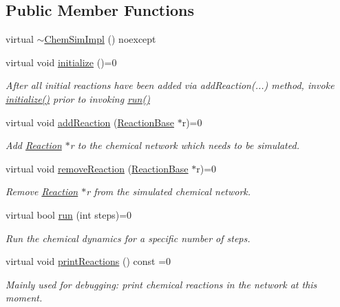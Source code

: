\subsection*{Public Member Functions}
\begin{DoxyCompactItemize}
\item 
virtual \hyperlink{classChemSimImpl_a80f4448613360c953bb57e25b4366737}{$\sim$\+Chem\+Sim\+Impl} () noexcept
\item 
virtual void \hyperlink{classChemSimImpl_a8050874ed2646d6632ec9df1704c86c4}{initialize} ()=0
\begin{DoxyCompactList}\small\item\em After all initial reactions have been added via add\+Reaction(...) method, invoke \hyperlink{classChemSimImpl_a8050874ed2646d6632ec9df1704c86c4}{initialize()} prior to invoking \hyperlink{classChemSimImpl_a3472132dc4b356ed76116c40af2a773d}{run()} \end{DoxyCompactList}\item 
virtual void \hyperlink{classChemSimImpl_ae1ca0468b4564703d87d69f45ee6e1f9}{add\+Reaction} (\hyperlink{classReactionBase}{Reaction\+Base} $\ast$r)=0
\begin{DoxyCompactList}\small\item\em Add \hyperlink{classReaction}{Reaction} $\ast$r to the chemical network which needs to be simulated. \end{DoxyCompactList}\item 
virtual void \hyperlink{classChemSimImpl_a2561de21097a1b12bc60bc53a966e9fc}{remove\+Reaction} (\hyperlink{classReactionBase}{Reaction\+Base} $\ast$r)=0
\begin{DoxyCompactList}\small\item\em Remove \hyperlink{classReaction}{Reaction} $\ast$r from the simulated chemical network. \end{DoxyCompactList}\item 
virtual bool \hyperlink{classChemSimImpl_a3472132dc4b356ed76116c40af2a773d}{run} (int steps)=0
\begin{DoxyCompactList}\small\item\em Run the chemical dynamics for a specific number of steps. \end{DoxyCompactList}\item 
virtual void \hyperlink{classChemSimImpl_a1c0d35dbca7647319a27fa7eaff7388b}{print\+Reactions} () const =0
\begin{DoxyCompactList}\small\item\em Mainly used for debugging\+: print chemical reactions in the network at this moment. \end{DoxyCompactList}\end{DoxyCompactItemize}


